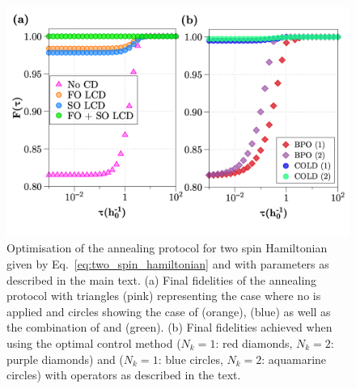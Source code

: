 \begin{figure}[t]
    \centering
    \includegraphics[width=0.8\linewidth]{images_v1/twospins_fidelities.png} \caption[COLD applied to two-spin annealing]{Optimisation of the annealing protocol for two spin Hamiltonian given by Eq.~\eqref{eq:two_spin_hamiltonian} and with parameters as described in the main text.  (a) Final fidelities of the annealing protocol with triangles (pink) representing the case where no  is applied and circles showing the case of   (orange),   (blue) as well as the combination of  and   (green). (b) Final fidelities achieved when using the optimal control method  ($N_k = 1$: red diamonds, $N_k = 2$: purple diamonds) and  ($N_k = 1$: blue circles, $N_k = 2$: aquamarine circles) with   operators as described in the text.}\label{fig:twospin_fidelities}
\end{figure}

